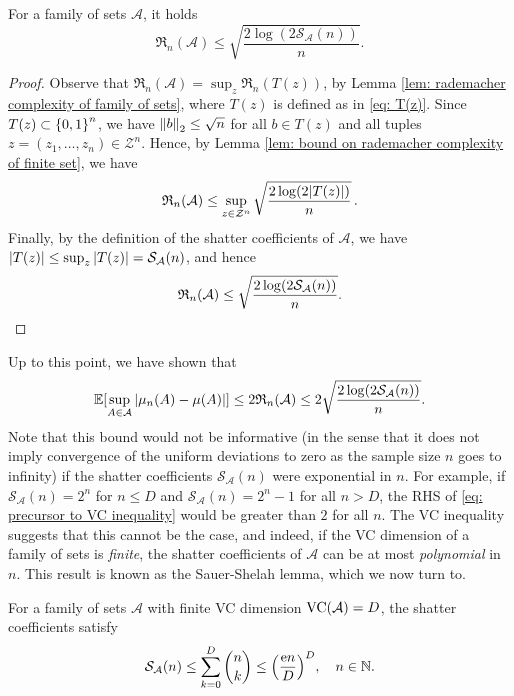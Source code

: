 \begin{proposition}
\label{prop: bound on rademacher complexity of family of sets}
For a family of sets $\mathcal{A}$, it holds
\[
    \mathfrak{R}_n(\mathcal{A}) \leq \sqrt{\frac{2 \log(2 \mathcal{S}_{\mathcal{A}}(n)) }{n}}.
\]
\end{proposition}

\begin{proof}
Observe that $\mathfrak{R}_n(\mathcal{A}) = \sup_z \mathfrak{R}_n(T(z))$, by Lemma \ref{lem: rademacher complexity of family of sets}, where $T(z)$ is defined as in \eqref{eq: T(z)}. Since $T(z) \subset \set{0, 1}^n$, we have $\norm{b}_2 \leq \sqrt{n}$ for all $b \in T(z)$ and all tuples $z = (z_1, \dots, z_n) \in \mathcal{Z}^n$. Hence, by Lemma \ref{lem: bound on rademacher complexity of finite set}, we have
\[
    \mathfrak{R}_n(\mathcal{A}) \leq \sup_{z \in \mathcal{Z}^n} \sqrt{\frac{2 \log(2 \abs{T(z)})}{n}} \, .
\]
Finally, by the definition of the shatter coefficients of $\mathcal{A}$, we have $\abs{T(z)} \leq \sup_z \abs{T(z)} = \mathcal{S}_{\mathcal{A}}(n)$, and hence
\[
    \mathfrak{R}_n(\mathcal{A}) \leq \sqrt{\frac{2 \log(2 \mathcal{S}_{\mathcal{A}}(n)) }{n}}. \qedhere
\]
\end{proof}

Up to this point, we have shown that
\begin{equation}
\label{eq: precursor to VC inequality}
    \operatorname{\mathbb{E}}[\sup_{A \in \mathcal{A}} \abs{\mu_n(A) - \mu(A)}] \leq 2 \mathfrak{R}_n(\mathcal{A}) \leq 2 \sqrt{\frac{2 \log(2 \mathcal{S}_{\mathcal{A}}(n))}{n}}.
\end{equation}
Note that this bound would not be informative (in the sense that it does not imply convergence of the uniform deviations to zero as the sample size $n$ goes to infinity) if the shatter coefficients $\mathcal{S}_{\mathcal{A}}(n)$ were exponential in $n$. For example, if $\mathcal{S}_{\mathcal{A}}(n) = 2^n$ for $n \leq D$ and $\mathcal{S}_{\mathcal{A}}(n) = 2^n - 1$ for all $n > D$, the RHS of \eqref{eq: precursor to VC inequality} would be greater than $2$ for all $n$. The VC inequality suggests that this cannot be the case, and indeed, if the VC dimension of a family of sets is \emph{finite}, the shatter coefficients of $\mathcal{A}$ can be at most \emph{polynomial} in $n$. This result is known as the Sauer-Shelah lemma, which we now turn to.

\begin{lemma}
For a family of sets $\mathcal{A}$ with finite VC dimension $\operatorname{VC}(\mathcal{A}) = D$, the shatter coefficients satisfy
\[
    \mathcal{S}_{\mathcal{A}}(n) \leq \sum_{k=0}^D \binom{n}{k} \leq \left(\frac{\e n}{D}\right)^D, \quad n \in \N.
\]
\end{lemma}

